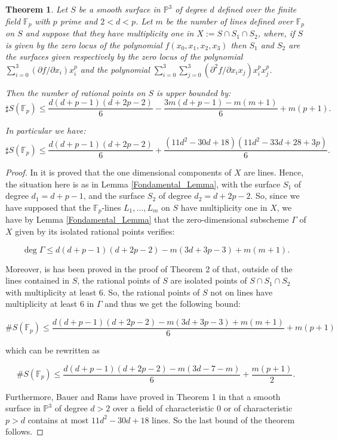 \documentclass[12pt]{amsart}
\newtheorem{theorem}[lemma]{Theorem}
\theoremstyle{definition}
\newcommand{\PP}{{\mathbb P}}
\newcommand{\F}{{\mathbb F}}
\def\PP{\mathbb{P}}
\begin{document}
\begin{theorem}\label{Main_Theorem}
Let $S$ be a smooth surface in $\PP^3$ of degree $d$ defined over the finite field ${\mathbb F}_p$ with $p$ prime and $2<d<p$. 
Let  $m$ be the number of lines defined over ${\mathbb F}_p$ on $S$ and suppose that they have multiplicity one in $X:=S\cap S_1\cap S_2$,
where, if $S$ is given by the zero locus of the polynomial
$f(x_0,x_1,x_2,x_3)$ then
 $S_1$ and $S_2$ are the surfaces given respectively by the zero locus of 
the polynomial $\sum_{i=0}^3(\partial f/\partial x_i)x_i^p$ and
the polynomial
$\sum_{i=0}^3\sum_{j=0}^3(\partial^2 f/\partial x_ix_j)x_i^px_j^p$.




Then the number of rational points on $S$ is upper bounded by:
\begin{equation}\label{Improved_bound}
\sharp S({\mathbb F}_p) \leq \frac{d(d+p-1)(d+2p-2)}{6}
-\frac{3m(d+p-1)-m(m+1)}{6}
+m(p+1).
\end{equation}



In particular we have:
\begin{equation}\label{Improved_without_m}
\sharp S({\mathbb F}_p) \leq \frac{d(d+p-1)(d+2p-2)}{6}
+\frac{(11d^2-30d+18)(11d^2-33d +28 +3p)}{6}.
\end{equation}



\end{theorem}

\begin{proof}
In \cite{Voloch} it is proved that the one dimensional components of $X$ are lines. Hence, the situation here is as in Lemma \ref{Fondamental_Lemma}, with the surface $S_1$ of degree $d_1 = d + p -1$, and the surface $S_2$ of degree $d_2 =d+2p -2$.
So, since we have supposed that the ${\mathbb F}_p$-lines $L_1,\ldots, L_m$ on $S$ have multiplicity one in $X$, we have by Lemma \ref{Fondamental_Lemma} that the zero-dimensional subscheme $\Gamma$ of $X$ given by its isolated rational points verifies:

$$\deg \Gamma \le d(d + p -1)(d+2p -2) -m(3d +3p-3) + m(m+1).$$

Moreover, is has been proved in the proof of Theorem 2 of  \cite{Voloch} that, outside of the lines contained  in $S$,  
the rational points of $S$ are isolated points of $S\cap S_1\cap S_2$ with multiplicity at least $6$.
So, the rational points of $S$ not on lines have multiplicity at least $6$ in $\Gamma$ and thus
 we get the following bound:

$$\# S(\F_p) \le \frac{d(d + p -1)(d+2p -2) -m(3d +3p-3) + m(m+1)}{6} + m(p+1)$$

which can be rewritten as



$$\# S(\F_p) \le \frac{d(d + p -1)(d+2p -2) -m(3d-7-m)}{6} + \frac{m(p+1)}{2}.$$

Furthermore,  
Bauer and Rams have proved in Theorem 1 in \cite{Bauer-Rams}
 that a smooth surface in ${\mathbb P}^3$  of degree $d>2$ over a field of characteristic 0 or of characteristic $p>d$  contains at most
 $11d^2-30d+18$  lines. So the last bound of the theorem follows.
\end{proof}
\end{document}
